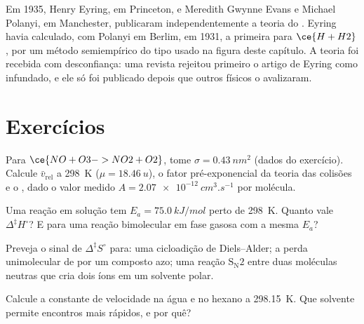 \begin{history}
Em 1935, Henry Eyring, em Princeton, e Meredith Gwynne Evans e Michael Polanyi,
em Manchester, publicaram independentemente a teoria do .
Eyring havia calculado, com Polanyi em Berlim, em 1931, a primeira  para $\ce{H + H2}$, por um método semiempírico do tipo usado na
figura deste capítulo. A teoria foi recebida com desconfiança: uma revista
rejeitou primeiro o artigo de Eyring como infundado, e ele só foi publicado depois
que outros físicos o avalizaram.
\end{history}

\section{Exercícios}

\begin{exercise}[$\star$]\label{exo:b3:rate-theories:1}
Para $\ce{NO + O3 -> NO2 + O2}$, tome $\sigma = \qty{0.43}{nm^2}$ (dados do exercício). Calcule $\bar v_{\mathrm{rel}}$
a \qty{298}{K} ($\mu = \qty{18.46}{u}$), o fator pré-exponencial da teoria das colisões e o
, dado o valor medido $A = \qty{2.07e-12}{cm^3.s^{-1}}$ por molécula.
\end{exercise}

\begin{exercise}[$\star$]\label{exo:b3:rate-theories:2}
Uma reação em solução tem $E_a = \qty{75.0}{kJ/mol}$ perto de \qty{298}{K}. Quanto vale $\Delta^{\ddagger}H^\circ$? E
para uma reação bimolecular em fase gasosa com a mesma $E_a$?
\end{exercise}

\begin{exercise}[$\star$]\label{exo:b3:rate-theories:3}
Preveja o sinal de $\Delta^{\ddagger}S^\circ$ para: uma cicloadição de Diels--Alder; a perda
unimolecular de  por um composto azo; uma reação $\mathrm{S_N2}$ entre duas moléculas
neutras que cria dois íons em um solvente polar.
\end{exercise}

\begin{exercise}[$\star$]\label{exo:b3:rate-theories:4}
Calcule a constante de velocidade  na água e no hexano a
\qty{298.15}{K}. Que solvente permite encontros mais rápidos, e por quê?
\end{exercise}

